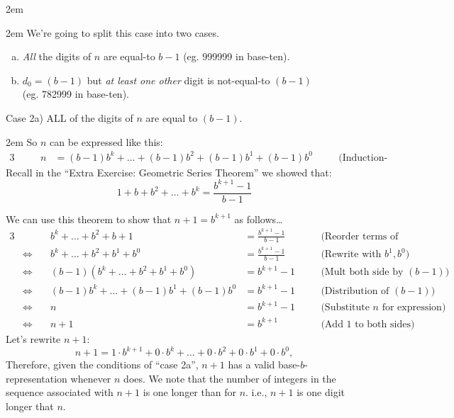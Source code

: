 \documentclass{article}
\newenvironment{jprIn}{\begin{adjustwidth}{2em}{}}{\end{adjustwidth}}
\begin{document}
\begin{jprIn}
\begin{jprIn}
We're going to split this case into two cases.

\begin{enumerate}[a)]
\item \emph{All} the digits of $n$ are equal-to $b{-}1$ (eg. 999999 in base-ten).
\item $d_0=(b-1)$ but \emph{at least one other} digit is not-equal-to $(b-1)$\\
(eg. 782999 in base-ten).
\end{enumerate}

Case 2a) ALL of the digits of $n$ are equal to $(b-1)$.
\begin{jprIn}
So $n$ can be expressed like this:
\begin{alignat*}{3}
  &\quad&n
  &= (b{-}1)b^k+\dots{}+(b{-}1)b^2+(b{-}1)b^1+(b{-}1)b^0 &&\quad\text{(Induction-Assumption)}
\end{alignat*}
Recall in the ``Extra Exercise: Geometric Series Theorem''
we showed that:
\[1+b+b^2+\dots{}+b^k=\frac{b^{k+1}-1}{b-1}\]

We can use this theorem to show that $n+1=b^{k+1}$ as follows\dots
\smallskip
{\small
\begin{alignat*}{3}
  &&b^k+\dots{}+b^2+b+1
  &= \frac{b^{k+1}-1}{b-1} &&\quad\text{(Reorder terms of G.S.Thm.)}\\
  &\Leftrightarrow\quad
  &b^k+\dots{}+b^2+b^1+b^0
  &= \frac{b^{k+1}-1}{b-1} &&\quad\text{(Rewrite with }b^1, b^0\text{)}\\
  &\Leftrightarrow\quad
  &(b-1)(b^k+\dots{}+b^2+b^1+b^0)
  &= b^{k+1}-1 &&\quad\text{(Mult both side by }(b{-}1)\text{)}\\
  &\Leftrightarrow\quad
  &(b{-}1)b^k+\dots{}+(b{-}1)b^1+(b{-}1)b^0
  &= b^{k+1}-1 &&\quad\text{(Distribution of }(b{-}1)\text{)}\\
  &\Leftrightarrow\quad
  &n
  &= b^{k+1}-1 &&\quad\text{(Substitute }n\text{ for expression)}\\
  &\Leftrightarrow\quad
  &n+1
  &= b^{k+1} &&\quad\text{(Add 1 to both sides)}
\end{alignat*}
}Let's rewrite $n+1$:
\[n+1= 1\cdot{}b^{k+1}+0\cdot{}b^{k}+\dots{}+0\cdot{}b^2+0\cdot{}b^1+0\cdot{}b^0,\]
Therefore, given the conditions of ``case 2a'', $n+1$ has
a valid base-$b$-representation whenever $n$ does.
We note that
the number of integers in the sequence associated
with $n+1$ is one longer than for $n$. i.e., $n+1$ is one digit longer that $n$.


\end{jprIn}
\end{jprIn}
\end{jprIn}
\end{document}
